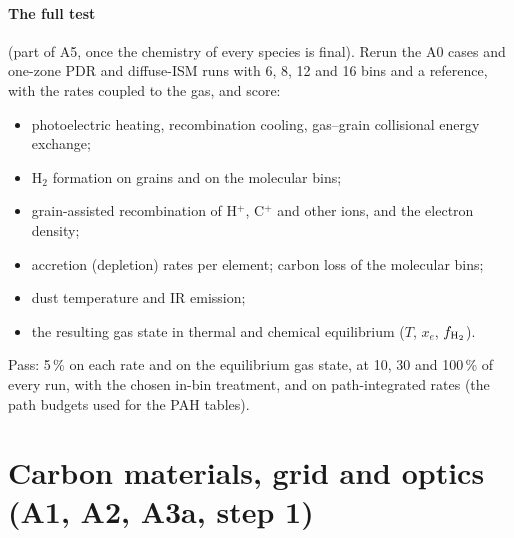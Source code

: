 \documentclass[11pt,a4paper]{article}
\begin{document}
\paragraph{The full test} (part of A5, once the chemistry of every species is final). Rerun the A0 cases and one-zone
PDR and diffuse-ISM runs with 6, 8, 12 and 16 bins and a reference, with the rates coupled to the gas, and score:
\begin{itemize}
\item photoelectric heating, recombination cooling, gas--grain collisional energy exchange;
\item H$_2$ formation on grains and on the molecular bins;
\item grain-assisted recombination of H$^+$, C$^+$ and other ions, and the electron density;
\item accretion (depletion) rates per element; carbon loss of the molecular bins;
\item dust temperature and IR emission;
\item the resulting gas state in thermal and chemical equilibrium ($T$, $x_e$, $f_{\rm H_2}$).
\end{itemize}
Pass: 5\,\% on each rate and on the equilibrium gas state, at 10, 30 and 100\,\% of every run, with the chosen in-bin
treatment, and on path-integrated rates (the path budgets used for the PAH tables).

\section{Carbon materials, grid and optics (A1, A2, A3a, step 1)}\label{sec:materials}
\end{document}
